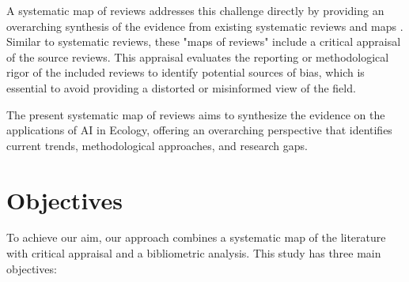 \documentclass{article}
\begin{document}
A systematic map of reviews addresses this challenge directly by providing an overarching synthesis of the evidence from existing systematic reviews and maps \citep{biondi2016umbrella}. Similar to systematic reviews, these "maps of reviews"  include a critical appraisal of the source reviews. This appraisal evaluates the reporting or methodological rigor of the included reviews to identify potential sources of bias, which is essential to avoid providing a distorted or misinformed view of the field.

The present systematic map of reviews aims to synthesize the evidence on the applications of AI in Ecology, offering an overarching perspective that identifies current trends, methodological approaches, and research gaps.



\section{Objectives}
To achieve our aim,  our approach combines a systematic map of the literature with critical appraisal and a bibliometric analysis. This study has three main objectives:
\end{document}
